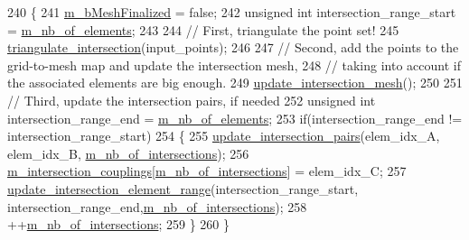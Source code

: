 \begin{DoxyCode}
240 \{
241     \hyperlink{classcarl_1_1_mesh___intersection_ae858bc08b5286b0562eaf94372944bcd}{m\_bMeshFinalized} = \textcolor{keyword}{false};
242     \textcolor{keywordtype}{unsigned} \textcolor{keywordtype}{int} intersection\_range\_start = \hyperlink{classcarl_1_1_mesh___intersection_acd2052a59c0bc759f86b3e4810093a54}{m\_nb\_of\_elements};
243 
244     \textcolor{comment}{//  First, triangulate the point set!}
245     \hyperlink{classcarl_1_1_mesh___intersection_aa8a75085ca6f75f96ad47e36b6dd8509}{triangulate\_intersection}(input\_points);
246 
247     \textcolor{comment}{//  Second, add the points to the grid-to-mesh map and update the intersection mesh,}
248     \textcolor{comment}{// taking into account if the associated elements are big enough.}
249     \hyperlink{classcarl_1_1_mesh___intersection_a040f460bc10dd0fd1d7fb27d25e733ac}{update\_intersection\_mesh}();
250 
251     \textcolor{comment}{//  Third, update the intersection pairs, if needed}
252     \textcolor{keywordtype}{unsigned} \textcolor{keywordtype}{int} intersection\_range\_end = \hyperlink{classcarl_1_1_mesh___intersection_acd2052a59c0bc759f86b3e4810093a54}{m\_nb\_of\_elements};
253     \textcolor{keywordflow}{if}(intersection\_range\_end != intersection\_range\_start)
254     \{
255         \hyperlink{classcarl_1_1_mesh___intersection_aabfd4b640763d00e1a7786d4724732af}{update\_intersection\_pairs}(elem\_idx\_A, elem\_idx\_B,
      \hyperlink{classcarl_1_1_mesh___intersection_a60ae2905b3c3debe5194811e176826ce}{m\_nb\_of\_intersections});
256         \hyperlink{classcarl_1_1_mesh___intersection_ab0d6f92956f02022cfdfb2e3b84e1676}{m\_intersection\_couplings}[\hyperlink{classcarl_1_1_mesh___intersection_a60ae2905b3c3debe5194811e176826ce}{m\_nb\_of\_intersections}] = 
      elem\_idx\_C;
257         \hyperlink{classcarl_1_1_mesh___intersection_a86537a2c060ef77c8f9d20f8c5bd6c40}{update\_intersection\_element\_range}(intersection\_range\_start,
      intersection\_range\_end,\hyperlink{classcarl_1_1_mesh___intersection_a60ae2905b3c3debe5194811e176826ce}{m\_nb\_of\_intersections});
258         ++\hyperlink{classcarl_1_1_mesh___intersection_a60ae2905b3c3debe5194811e176826ce}{m\_nb\_of\_intersections};
259     \}
260 \}
\end{DoxyCode}
\hypertarget{classcarl_1_1_mesh___intersection_a195605fd295d5afc638129309103f576}{}
